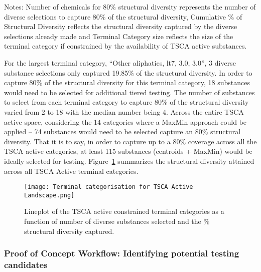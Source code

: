 \documentclass[
  super,
  preprint,
  3p]{elsarticle}
\begin{document}
Notes: Number of chemicals for 80\% structural diversity represents the
number of diverse selections to capture 80\% of the structural
diversity, Cumulative \% of Structural Diversity reflects the structural
diversity captured by the diverse selections already made and Terminal
Category size reflects the size of the terminal category if constrained
by the availability of TSCA active substances.

For the largest terminal category, ``Other aliphatics, lt7, 3.0, 3.0'',
3 diverse substance selections only captured 19.85\% of the structural
diversity. In order to capture 80\% of the structural diversity for this
terminal category, 18 substances would need to be selected for
additional tiered testing. The number of substances to select from each
terminal category to capture 80\% of the structural diversity varied
from 2 to 18 with the median number being 4. Across the entire TSCA
active space, considering the 14 categories where a MaxMin approach
could be applied -- 74 substances would need to be selected capture an
80\% structural diversity. That it is to say, in order to capture up to
a 80\% coverage across all the TSCA active categories, at least 115
substances (centroids + MaxMin) would be ideally selected for testing.
Figure~\ref{fig-structdiv-tsca} summarizes the structural diversity
attained across all TSCA Active terminal categories.

\begin{figure}

{\centering \texttt{[image: Terminal categorisation for TSCA Active Landscape.png]}

}

\caption{\label{fig-structdiv-tsca}Lineplot of the TSCA active
constrained terminal categories as a function of number of diverse
substances selected and the \% structural diversity captured.}

\end{figure}

\hypertarget{proof-of-concept-workflow-identifying-potential-testing-candidates}{%
\subsubsection{Proof of Concept Workflow: Identifying potential testing
candidates}\label{proof-of-concept-workflow-identifying-potential-testing-candidates}}
\end{document}
